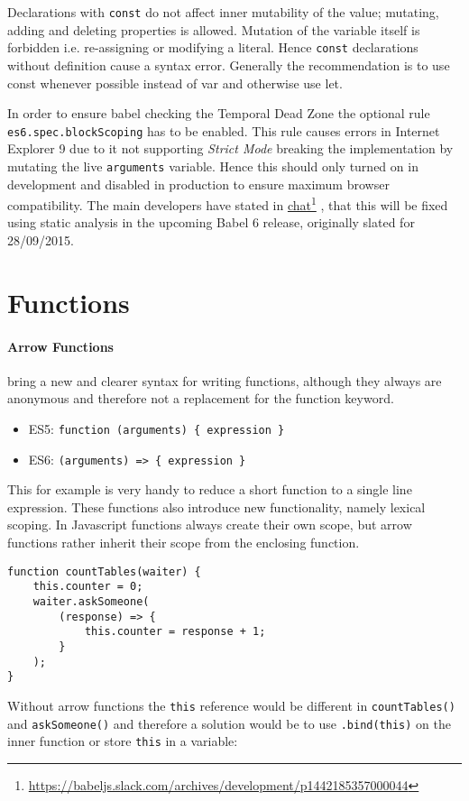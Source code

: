 \documentclass{bioinfo}
\newcommand\fnurl[2]{%
  \href{#1}{#2}\footnote{\url{#1}}%
}
\begin{document}
Declarations with {\tt const} do not affect inner mutability of the value;
mutating, adding and deleting properties is allowed. Mutation of the variable
itself is forbidden i.e. re-assigning or modifying a literal. Hence {\tt const}
declarations without definition cause a syntax error. Generally the recommendation
is to use const whenever possible instead of var and otherwise use let.

In order to ensure babel checking the Temporal Dead Zone the optional rule
{\tt es6.spec.blockScoping} has to be enabled. This rule causes errors in
Internet Explorer 9 due to it not supporting {\sl Strict Mode} breaking the
implementation by mutating the live {\tt arguments} variable. Hence this
should only turned on in development and disabled in production
to ensure maximum browser compatibility. The main developers have stated in
\fnurl{https://babeljs.slack.com/archives/development/p1442185357000044}{chat},
that this will be fixed using static analysis in the upcoming Babel 6 release,
originally slated for 28/09/2015.

\section{Functions}
\paragraph{Arrow Functions}
bring a new and clearer syntax for writing functions, although
they always are anonymous and therefore not a replacement for the function keyword.
\begin{itemize}
    \item ES5: \tt{function (arguments) \{ expression \}}
    \item ES6: \tt{(arguments) => \{ expression \}}
\end{itemize}
This for example is very handy to reduce a short function to a single line expression.
These functions also introduce new functionality, namely lexical scoping.
In Javascript functions always create their own scope, but arrow functions
rather inherit their scope from the enclosing function.

\begin{lstlisting}
function countTables(waiter) {
    this.counter = 0;
    waiter.askSomeone(
        (response) => {
            this.counter = response + 1;
        }
    );
}
\end{lstlisting}

Without arrow functions the {\tt this} reference would be different in
{\tt countTables()} and {\tt askSomeone()} and therefore a
solution would be to use {\tt .bind(this)} on the inner function or store
{\tt this} in a variable:
\end{document}
